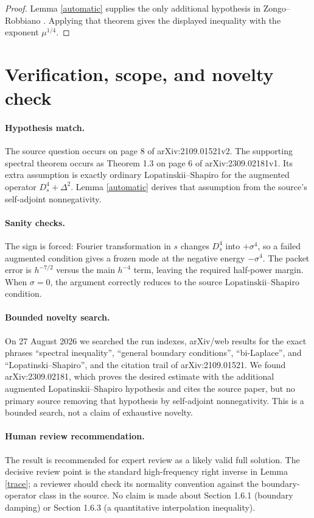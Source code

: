 \documentclass[11pt]{article}
\newcommand{\LS}{\text{Lopatinskii--Shapiro}}
\begin{document}
\begin{proof}
Lemma \ref{automatic} supplies the only additional hypothesis in
Zongo--Robbiano \cite[Theorem 1.3]{support}. Applying that theorem gives the
displayed inequality with the exponent $\mu^{1/4}$.
\end{proof}

\section{Verification, scope, and novelty check}

\paragraph{Hypothesis match.}
The source question occurs on page 8 of arXiv:2109.01521v2. The supporting
spectral theorem occurs as Theorem 1.3 on page 6 of arXiv:2309.02181v1. Its
extra assumption is exactly ordinary $\LS$ for the augmented operator
$D_s^4+\Delta^2$. Lemma \ref{automatic} derives that assumption from the
source's self-adjoint nonnegativity.

\paragraph{Sanity checks.}
The sign is forced: Fourier transformation in $s$ changes $D_s^4$ into
$+\sigma^4$, so a failed augmented condition gives a frozen mode at the
negative energy $-\sigma^4$. The packet error is $h^{-7/2}$ versus the main
$h^{-4}$ term, leaving the required half-power margin. When $\sigma=0$, the
argument correctly reduces to the source $\LS$ condition.

\paragraph{Bounded novelty search.}
On 27 August 2026 we searched the run indexes, arXiv/web results for the exact
phrases ``spectral inequality'', ``general boundary conditions'',
``bi-Laplace'', and ``Lopatinski--Shapiro'', and the citation trail of
arXiv:2109.01521. We found arXiv:2309.02181, which proves the desired estimate
with the additional augmented $\LS$ hypothesis and cites the source paper,
but no primary source removing that hypothesis by self-adjoint nonnegativity.
This is a bounded search, not a claim of exhaustive novelty.

\paragraph{Human review recommendation.}
The result is recommended for expert review as a likely valid full solution.
The decisive review point is the standard high-frequency right inverse in
Lemma \ref{trace}; a reviewer should check its normality convention against
the boundary-operator class in the source. No claim is made about Section
1.6.1 (boundary damping) or Section 1.6.3 (a quantitative interpolation
inequality).
\end{document}
